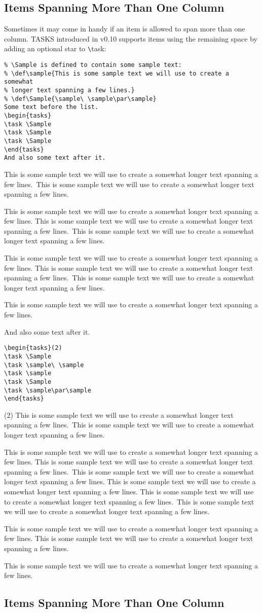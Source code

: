 \documentclass[a4paper,12pt,indent]{article}
\begin{document}
\subsection{Items Spanning More Than One Column}

Sometimes it may come in handy if an item is allowed to span more than one column. \textcolor{Tasks}{TASKS} introduced in
v0.10
supports items using the remaining space by adding an optional star to \verb|\|\textcolor{Tasks}{task}:

\def\sample{This is some sample text we will use to create a somewhat
longer text spanning a few lines.}
\def\Sample{\sample\ \sample\par\sample}
\begin{tcolorbox}[collower=black,colframe=Tasks,colback=white]
\begin{lstlisting}
% \Sample is defined to contain some sample text:
% \def\sample{This is some sample text we will use to create a somewhat
% longer text spanning a few lines.}
% \def\Sample{\sample\ \sample\par\sample}
Some text before the list.
\begin{tasks}
\task \Sample
\task \Sample
\task \Sample
\end{tasks}
And also some text after it.
\end{lstlisting}
\tcblower
\begin{tasks}
\task \Sample
\task \Sample
\task \Sample
\end{tasks}
And also some text after it.
\end{tcolorbox}

\begin{tcolorbox}[collower=black,colframe=Tasks,colback=white]
    \begin{lstlisting}
\begin{tasks}(2)
\task \Sample
\task \sample\ \sample
\task \sample
\task \Sample
\task \sample\par\sample
\end{tasks}
    \end{lstlisting}
    \tcblower
    \begin{tasks}(2)
        \task \Sample
        \task \sample\ \sample
        \task \sample
        \task \Sample
        \task \sample\par\sample
        \end{tasks}
    \end{tcolorbox}


\subsection{Items Spanning More Than One Column}
\end{document}
